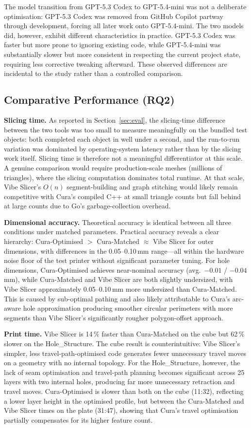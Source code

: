 \documentclass[10pt,twocolumn,a4paper]{article}
\begin{document}
The model transition from GPT-5.3 Codex to GPT-5.4-mini
was not a deliberate optimisation: GPT-5.3 Codex was removed
from GitHub Copilot partway through development, forcing all
later work onto GPT-5.4-mini. The two models did, however,
exhibit different characteristics in practice. GPT-5.3 Codex was
faster but more prone to ignoring existing code, while
GPT-5.4-mini was substantially slower but more consistent in respecting the
current project state, requiring less corrective tweaking
afterward. These observed differences are incidental to the
study rather than a controlled comparison.

\subsection{Comparative Performance (RQ2)}
\textbf{Slicing time.}
As reported in Section~\ref{sec:eval}, the slicing-time difference
between the two tools was too small to measure meaningfully on the
bundled test objects: both completed each object in well under a
second, and the run-to-run variation was dominated by
operating-system latency rather than by the slicing work itself.
Slicing time is therefore not a meaningful differentiator at this
scale. A genuine comparison would require production-scale meshes
(millions of triangles), where the slicing computation dominates
total runtime. At that scale, Vibe Slicer's $O(n)$ segment-building
and graph stitching would likely remain competitive with Cura's
compiled C++ at small triangle counts but fall behind at large
counts due to Go's garbage-collection overhead.

\textbf{Dimensional accuracy.}
Theoretical accuracy is identical between all three conditions under
matched parameters.
Practical accuracy reveals a clear hierarchy:
Cura-Optimised $>$ Cura-Matched $\approx$ Vibe Slicer
for outer dimensions, with differences in the 0.05--0.10\,mm
range—all within the hardware noise floor of the test printer without significant parameter tuning.
For hole dimensions, Cura-Optimised achieves near-nominal
accuracy (avg.\ $-0.01$ / $-0.04$\,mm), while Cura-Matched
and Vibe Slicer are both slightly undersized, with Vibe Slicer
approximately 0.05--0.10\,mm more undersized than Cura-Matched.
This is caused by sub-optimal pathing and also likely attributable to Cura's arc-aware hole
approximation producing smoother circular perimeters with more
segments than Vibe Slicer's significantly rougher polygon-offset approach.

\textbf{Print time.}
Vibe Slicer is 14\,\% faster than Cura-Matched on the cube
but 62\,\% slower on the Hole\_Structure.
The cube result is counterintuitive: Vibe Slicer's simpler,
less travel-path-optimised code generates fewer unnecessary
travel moves on a geometry with no internal topology.
For the Hole\_Structure, however, the lack of seam optimisation
and travel-path planning becomes significant across 25 layers
with two internal holes, producing far more unnecessary retraction and
travel moves.
Cura-Optimised is slower than both on the cube (11:32),
reflecting a lower layer height in the optimised profile,
but between the Cura-Matched and Vibe Slicer times
on the plate (31:47), showing that Cura's travel optimisation
partially compensates for its higher feature count.
\end{document}
